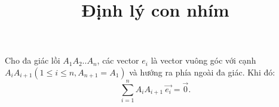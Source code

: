\documentclass{article}
\title{Định lý con nhím}
\begin{document}
\maketitle
Cho đa giác lồi $A_1A_2..A_n$, các vector $e_i$ là vector vuông góc với cạnh $A_iA_{i+1} (1 \le i \le n, A_{n+1} = A_1)$ và hướng ra phía ngoài đa giác. Khi đó:
$$\sum_{i = 1}^{n}{A_iA_{i+1} \ \vec{e_i}} = \vec{0}.$$
\end{document}
